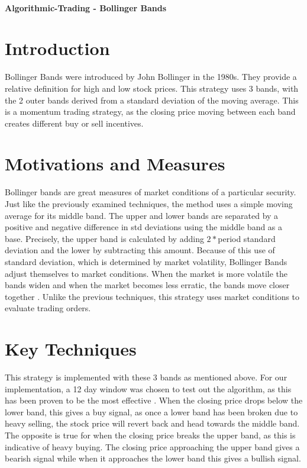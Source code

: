 \documentclass[letterpaper,11pt]{article}
\begin{document}
\thispagestyle{plain}


 \\

\noindent\textbf{Algorithmic-Trading - Bollinger Bands}

\section*{Introduction }

Bollinger Bands were introduced by John Bollinger in the 1980s. They provide a relative definition for high and low stock prices. This strategy uses 3 bands, with the 2 outer bands derived from a standard deviation of the moving average. This is a momentum trading strategy, as the closing price moving between each band creates different buy or sell incentives. 

\section*{Motivations and Measures}

Bollinger bands are great measures of market conditions of a particular security. Just like the previously examined techniques, the method uses a simple moving average for its middle band. The upper and lower bands are separated by a positive and negative difference in std deviations using the middle band as a base. Precisely, the upper band is calculated by adding $2 * $period standard deviation and the lower by subtracting this amount. Because of this use of standard deviation, which is determined by market volatility, Bollinger Bands adjust themselves to market conditions. When the market is more volatile the bands widen and when the market becomes less erratic, the bands move closer together \cite{Liu2006}. Unlike the previous techniques, this strategy uses market conditions to evaluate trading orders.

\section*{Key Techniques}

This strategy is implemented with these 3 bands as mentioned above. For our implementation, a 12 day window was chosen to test out the algorithm, as this has been proven to be the most effective \cite{Liu2006}. When the closing price drops below the lower band, this gives a buy signal, as once a lower band has been broken due to heavy selling, the stock price will revert back and head towards the middle band. The opposite is true for when the closing price breaks the upper band, as this is indicative of heavy buying. The closing price approaching the upper band gives a bearish signal while when it approaches the lower band this gives a bullish signal.
\end{document}
